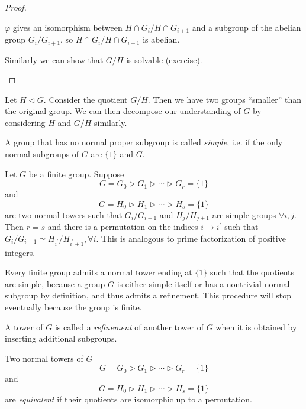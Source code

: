 \begin{proof}
\begin{itemize}
{\begin{enumerate}
{    $\varphi$ gives an isomorphism between
    $H \cap G_i / H \cap G_{i+1}$ and a subgroup of the abelian group
    $G_i / G_{i+1}$, so $H \cap G_i / H \cap G_{i+1}$ is abelian.
  }
\end{enumerate}
Similarly we can show that $G / H$ is solvable (exercise).
}
\end{itemize}
\end{proof}

Let $H \triangleleft G$. Consider the quotient $G / H$. Then we have
two groups ``smaller'' than the original group. We can then decompose
our understanding of $G$ by considering $H$ and $G/H$ similarly.

\begin{defn}
A group that has no normal proper subgroup is called \emph{simple},
i.e. if the only normal subgroups of $G$ are $\{1\}$ and $G$.
\end{defn}

\begin{theorem}
Let $G$ be a finite group. Suppose
$$
G = G_0 \triangleright G_1
        \triangleright \cdots
        \triangleright G_r = \{1\}
$$
and
$$
G = H_0 \triangleright H_1
        \triangleright \cdots
        \triangleright H_s = \{1\}
$$
are two normal towers such that
$G_i / G_{i+1}$ and $H_j / H_{j+1}$ are simple groups
$\forall i, j$. Then $r = s$ and there is a permutation
on the indices $i \to i^\prime$ such that
$G_i / G_{i+1} \simeq H_{i^\prime} / H_{i^\prime + 1}, \forall
i$. This is analogous to prime factorization of positive integers.
\end{theorem}

\begin{remark}
Every finite group admits a normal tower ending at $\{ 1 \}$ such that
the quotients are simple, because a group $G$ is either simple itself
or has a nontrivial normal subgroup by definition, and thus admits a
refinement. This procedure will stop eventually because the group is finite.
\end{remark}

\begin{defn}[Refinement]
A tower of $G$ is called a \emph{refinement} of another tower of $G$
when it is obtained by inserting additional subgroups.
\end{defn}

\begin{defn}
Two normal towers of $G$
$$
G = G_0 \triangleright G_1
        \triangleright \cdots
        \triangleright G_r = \{1\}
$$
and
$$
G = H_0 \triangleright H_1
        \triangleright \cdots
        \triangleright H_s = \{1\}
$$
are \emph{equivalent} if their quotients are isomorphic up to a permutation.
\end{defn}

